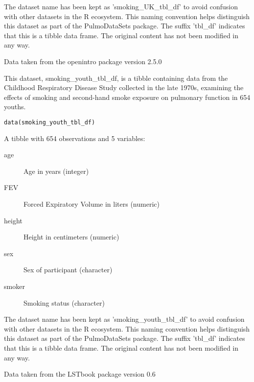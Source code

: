 \documentclass[a4paper]{book}
\begin{document}
%
\begin{Details}
The dataset name has been kept as 'smoking\_UK\_tbl\_df' to avoid confusion with other datasets
in the R ecosystem. This naming convention helps distinguish this dataset as part of the
PulmoDataSets package. The suffix 'tbl\_df' indicates that this is a tibble data frame.
The original content has not been modified in any way.
\end{Details}
%
\begin{Source}
Data taken from the openintro package version 2.5.0
\end{Source}
%
\begin{Description}
This dataset, smoking\_youth\_tbl\_df, is a tibble containing data from the Childhood
Respiratory Disease Study collected in the late 1970s, examining the effects of
smoking and second-hand smoke exposure on pulmonary function in 654 youths.
\end{Description}
%
\begin{Usage}
\begin{verbatim}
data(smoking_youth_tbl_df)
\end{verbatim}
\end{Usage}
%
\begin{Format}
A tibble with 654 observations and 5 variables:
\begin{description}

\item[age] Age in years (integer)
\item[FEV] Forced Expiratory Volume in liters (numeric)
\item[height] Height in centimeters (numeric)
\item[sex] Sex of participant (character)
\item[smoker] Smoking status (character)

\end{description}

\end{Format}
%
\begin{Details}
The dataset name has been kept as 'smoking\_youth\_tbl\_df' to avoid confusion with other
datasets in the R ecosystem. This naming convention helps distinguish this dataset
as part of the PulmoDataSets package. The suffix 'tbl\_df' indicates that this is a
tibble data frame. The original content has not been modified in any way.
\end{Details}
%
\begin{Source}
Data taken from the LSTbook package version 0.6
\end{Source}
\end{document}
